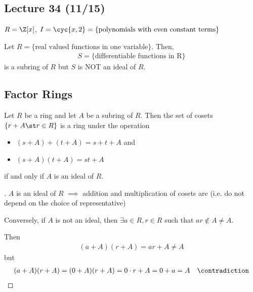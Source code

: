 
\subsection*{Lecture 34 (11/15)} %

\begin{example}
  \( R = \Z[x] \), \( I=\cyc{x,2}=\{\text{polynomials with even constant terms}\} \)
\end{example}

\begin{nonexample}
  Let \( R=\{\text{real valued functions in one variable}\} \). Then,
  \begin{align*}
    S=\{\text{differentiable functions in R}\}
  \end{align*}
  is a subring of \( R \) but \( S \) is NOT an ideal of \( R \).
\end{nonexample}

\subsection{Factor Rings}

\begin{theorem}
  Let \( R \) be a ring and let \( A \) be a subring of \( R \). Then the set of cosets \( \{r+A\st r\in R\} \)  is a ring under the operation
  \begin{itemize}
    \item \( (s+A)+(t+A) = s+t+A \) and
    \item \( (s+A)(t+A) = st+A\)
  \end{itemize}
  if and only if \( A \) is an ideal of \( R \).
\end{theorem}

\begin{proof}[]
  \( A \) is an ideal of \( R \) \( \implies \) addition and multiplication of cosets are  (i.e. do not depend on the choice of representative)

  Conversely, if \( A \) is not an ideal, then \( \exists a\in R, r\in R \) such that \( ar\not\in A \neq A \).

  Then
  \begin{align*}
    (a+A)(r+A) = ar+A\neq A
  \end{align*}
  but
  \begin{align*}
    (a+A)(r+A)=(0+A)(r+A) =0\cdot r+A=0+a=A \quad \contradiction
  \end{align*}
\end{proof}

